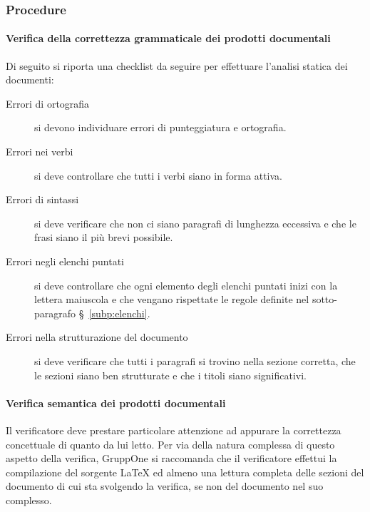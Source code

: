 \documentclass[../../norme-di-progetto.tex]{subfiles}
\begin{document}


\subsubsection{Procedure}%
\label{subs:verifica/procedure}

\paragraph{Verifica della correttezza grammaticale dei prodotti documentali}%
\label{par:verifica_grammaticale_dei_prodotti_documentali}

Di seguito si riporta una checklist da seguire per effettuare l'analisi statica dei documenti:

\begin{description}
  \item [Errori di ortografia] si devono individuare errori di punteggiatura e ortografia.
  \item [Errori nei verbi] si deve controllare che tutti i verbi siano in forma attiva.
  \item [Errori di sintassi] si deve verificare che non ci siano paragrafi di lunghezza eccessiva e che le frasi siano il più brevi possibile.
  \item [Errori negli elenchi puntati] si deve controllare che ogni elemento degli elenchi puntati inizi con la lettera maiuscola e che vengano rispettate le regole definite nel sotto-paragrafo §~\ref{subp:elenchi}.
  \item [Errori nella strutturazione del documento] si deve verificare che tutti i paragrafi si trovino nella sezione corretta, che le sezioni siano ben strutturate e che i titoli siano significativi.
\end{description}


\paragraph{Verifica semantica dei prodotti documentali}%
\label{par:verifica_semantica_dei_prodotti_documentali}

Il verificatore deve prestare particolare attenzione ad appurare la correttezza concettuale di quanto da lui letto. Per via della natura complessa di questo aspetto della verifica, GruppOne si raccomanda che il verificatore effettui la compilazione del sorgente \LaTeX{} ed almeno una lettura completa delle sezioni del documento di cui sta svolgendo la verifica, se non del documento nel suo complesso.
\end{document}

